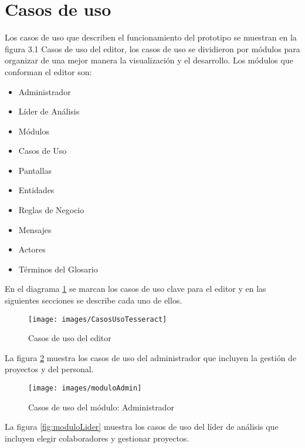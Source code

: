\section{Casos de uso}
Los casos de uso que describen el funcionamiento del prototipo se muestran en la figura 3.1 Casos de uso del editor, los casos de uso se dividieron por módulos para organizar de una mejor manera la visualización y el desarrollo. Los módulos que conforman el editor son:

\begin{itemize}
	\item Administrador
	\item Líder de Análisis
	\item Módulos
	\item Casos de Uso
	\item Pantallas
	\item Entidades
	\item Reglas de Negocio
	\item Mensajes
	\item Actores
	\item Términos del Glosario
\end{itemize}

En el diagrama \ref{fig:CasosUsoTesseract} se marcan los casos de uso clave para el editor y en las siguientes secciones se describe cada uno de ellos.

	\begin{figure}[H]
		\begin{center}
			\texttt{[image: images/CasosUsoTesseract]}
			\caption{Casos de uso del editor}
			\label{fig:CasosUsoTesseract}
		\end{center}
	\end{figure}

La figura \ref{fig:moduloAdmin} muestra los casos de uso del administrador que incluyen la gestión de proyectos y del personal.

	\begin{figure}[H]
		\begin{center}
			\texttt{[image: images/moduloAdmin]}
			\caption{Casos de uso del módulo: Administrador}
			\label{fig:moduloAdmin}
		\end{center}
	\end{figure}

La figura \ref{fig:moduloLider} muestra los casos de uso del líder de análisis que incluyen elegir colaboradores y gestionar proyectos.

